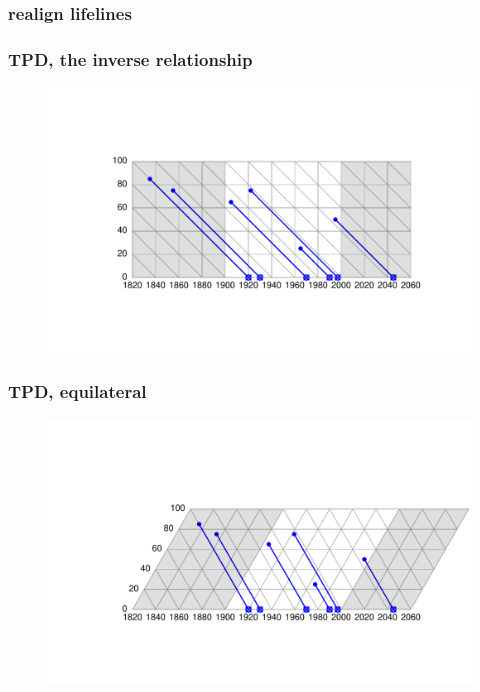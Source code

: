 \documentclass[20pt]{beamer}
\begin{document}
\begin{frame} 
\frametitle{realign lifelines}
\begin{figure}
    \centering
\end{figure} 
\end{frame} 

\begin{frame}
\frametitle{TPD, the inverse relationship}
\begin{figure}[b]
    \centering
    \includegraphics{Figures/LabPres/TPD2.pdf}
\end{figure} 
\end{frame}

\begin{frame}
\frametitle{TPD, equilateral}
\begin{figure}[b]
    \centering
    \includegraphics{Figures/LabPres/TPD3.pdf}
\end{figure} 
\end{frame}
\end{document}
